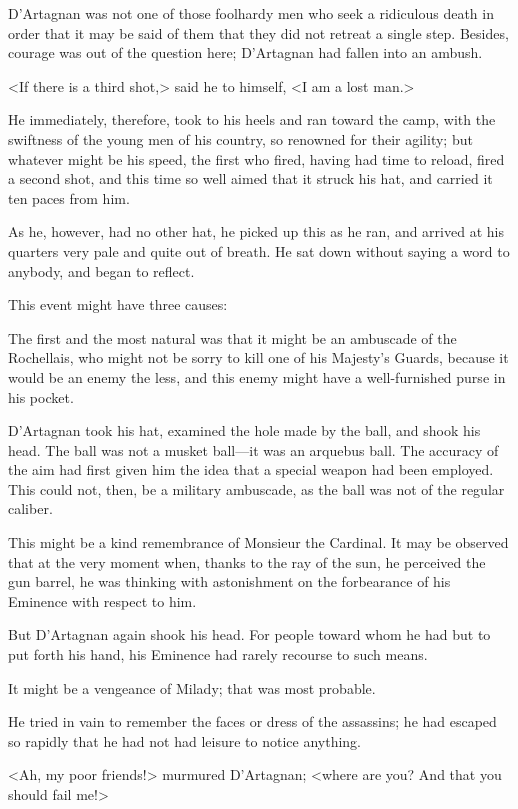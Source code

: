 D'Artagnan was not one of those foolhardy men who seek a ridiculous death in order that it may be said of them that they did not retreat a single step. Besides, courage was out of the question here; D'Artagnan had fallen into an ambush. 

<If there is a third shot,> said he to himself, <I am a lost man.> 

He immediately, therefore, took to his heels and ran toward the camp, with the swiftness of the young men of his country, so renowned for their agility; but whatever might be his speed, the first who fired, having had time to reload, fired a second shot, and this time so well aimed that it struck his hat, and carried it ten paces from him. 

As he, however, had no other hat, he picked up this as he ran, and arrived at his quarters very pale and quite out of breath. He sat down without saying a word to anybody, and began to reflect. 

This event might have three causes: 

The first and the most natural was that it might be an ambuscade of the Rochellais, who might not be sorry to kill one of his Majesty's Guards, because it would be an enemy the less, and this enemy might have a well-furnished purse in his pocket. 

D'Artagnan took his hat, examined the hole made by the ball, and shook his head. The ball was not a musket ball—it was an arquebus ball. The accuracy of the aim had first given him the idea that a special weapon had been employed. This could not, then, be a military ambuscade, as the ball was not of the regular caliber. 

This might be a kind remembrance of Monsieur the Cardinal. It may be observed that at the very moment when, thanks to the ray of the sun, he perceived the gun barrel, he was thinking with astonishment on the forbearance of his Eminence with respect to him. 

But D'Artagnan again shook his head. For people toward whom he had but to put forth his hand, his Eminence had rarely recourse to such means. 

It might be a vengeance of Milady; that was most probable. 

He tried in vain to remember the faces or dress of the assassins; he had escaped so rapidly that he had not had leisure to notice anything. 

<Ah, my poor friends!> murmured D'Artagnan; <where are you? And that you should fail me!> 

